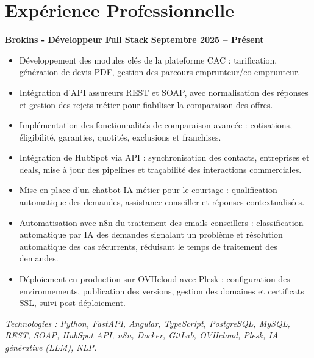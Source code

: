 \documentclass[10pt,a4paper]{article}
\begin{document}
\section{Expérience Professionnelle}

\textbf{Brokins - Développeur Full Stack} \hfill \textbf{Septembre 2025 -- Présent}
\begin{itemize}
    \item Développement des modules clés de la plateforme CAC : tarification, génération de devis PDF, gestion des parcours emprunteur/co-emprunteur.
    \item Intégration d'API assureurs REST et SOAP, avec normalisation des réponses et gestion des rejets métier pour fiabiliser la comparaison des offres.
    \item Implémentation des fonctionnalités de comparaison avancée : cotisations, éligibilité, garanties, quotités, exclusions et franchises.
    \item Intégration de HubSpot via API : synchronisation des contacts, entreprises et deals, mise à jour des pipelines et traçabilité des interactions commerciales.
    \item Mise en place d'un chatbot IA métier pour le courtage : qualification automatique des demandes, assistance conseiller et réponses contextualisées.
    \item Automatisation avec n8n du traitement des emails conseillers : classification automatique par IA des demandes signalant un problème et résolution automatique des cas récurrents, réduisant le temps de traitement des demandes.
    \item Déploiement en production sur OVHcloud avec Plesk : configuration des environnements, publication des versions, gestion des domaines et certificats SSL, suivi post-déploiement.
\end{itemize}
\textit{Technologies : Python, FastAPI, Angular, TypeScript, PostgreSQL, MySQL, REST, SOAP, HubSpot API, n8n, Docker, GitLab, OVHcloud, Plesk, IA générative (LLM), NLP.}
\end{document}
